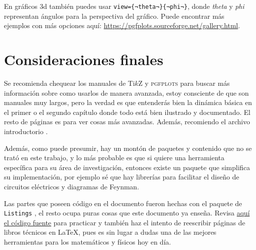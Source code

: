 \documentclass[intro-breve-latex.tex]{subfiles}
\begin{document}
En gráficos 3d también puedes usar \lstinline|view={¬theta¬}{¬phi¬}|, donde \textit{theta} y \textit{phi} representan
ángulos para la perspectiva del gráfico.
Puede encontrar más ejemplos con más opciones aquí: \url{https://pgfplots.sourceforge.net/gallery.html}.

\section{Consideraciones finales}
Se recomienda chequear los manuales de Ti$k$Z \cite{tikz} y \textsc{pgfplots} \cite{pgfplots} para buscar más
información sobre como usarlos de manera avanzada, estoy consciente de que son manuales muy largos, pero la verdad es
que entenderás bien la dinámica básica en el primer o el segundo capítulo donde todo está bien ilustrado y documentado.
El resto de páginas es para ver cosas más avanzadas.
Además, recomiendo el archivo introductorio \cite{cremer:tikz}.

Además, como puede presumir, hay un montón de paquetes y contenido que no se trató en este trabajo, y lo más probable es
que si quiere una herramienta específica para su área de investigación, entonces existe un paquete que simplifica su
implementación, por ejemplo sé que hay librerías para facilitar el diseño de circuitos eléctricos y diagramas de
Feynman.

Las partes que poseen código en el documento fueron hechas con el paquete de \texttt{Listings} \cite{listings}, el resto
ocupa puras cosas que este documento ya enseña.
Revisa \href{https://github.com/JoseCuevasBtos/apuntes-tex/blob/master/intro-breve-latex.tex}{aquí el código fuente}
para practicar y también haz el intento de reescribir páginas de libros técnicos en \LaTeX{}, pues es sin lugar a dudas
una de las mejores herramientas para los matemáticos y físicos hoy en día.

\printbibliography[category=math]
\end{document}
